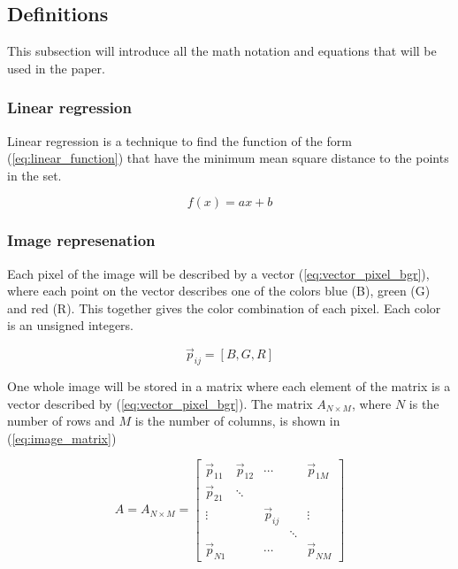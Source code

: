 \subsection{Definitions}
This subsection will introduce all the math notation and equations that will be used in the paper. 

\subsubsection{Linear regression}
\label{sec:regression}
Linear regression is a technique to find the function of the form (\ref{eq:linear_function}) that have the minimum mean square distance to the points in the set. 

\begin{equation}
    f(x) = ax + b
    \label{eq:linear_function}
\end{equation}

\subsubsection{Image represenation}

Each pixel of the image will be described by a vector (\ref{eq:vector_pixel_bgr}), where each point on the vector describes one of the colors blue (B), green (G) and red (R).  This together gives the color combination of each pixel. Each color is an unsigned integers. 


\begin{equation}
    \label{eq:vector_pixel_bgr}
    \vec{p}_{ij} = [B,G,R]
\end{equation} 

One whole image will be stored in a matrix where each element of the matrix is a vector described by (\ref{eq:vector_pixel_bgr}). The matrix $A_{N \times M}$, where $N$ is the number of rows and $M$ is the number of columns, is shown in (\ref{eq:image_matrix})

\begin{equation}
    \label{eq:image_matrix}
    A = A_{N \times M} =  
    \begin{bmatrix}
        \vec{p}_{11} & \vec{p}_{12} & \cdots & & \vec{p}_{1M}  \\
        \vec{p}_{21} & \ddots &        &       &                \\
        \vdots       &        &\vec{p}_{ij}&   & \vdots          \\
                     &        &        & \ddots&                  \\
        \vec{p}_{N1} &        &  \cdots &       & \vec{p}_{NM}  
    \end{bmatrix}
\end{equation}

